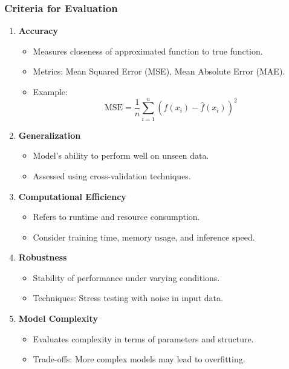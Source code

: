 \documentclass[aspectratio=169]{beamer}
\begin{document}
\begin{frame}[fragile]
  \frametitle{Criteria for Evaluation}
  \begin{enumerate}
    \item \textbf{Accuracy}
      \begin{itemize}
        \item Measures closeness of approximated function to true function.
        \item Metrics: Mean Squared Error (MSE), Mean Absolute Error (MAE).
        \item Example:
        \begin{equation}
          \text{MSE} = \frac{1}{n} \sum_{i=1}^n (f(x_i) - \hat{f}(x_i))^2
        \end{equation}
      \end{itemize}
      
    \item \textbf{Generalization}
      \begin{itemize}
        \item Model's ability to perform well on unseen data.
        \item Assessed using cross-validation techniques.
      \end{itemize}

    \item \textbf{Computational Efficiency}
      \begin{itemize}
        \item Refers to runtime and resource consumption.
        \item Consider training time, memory usage, and inference speed.
      \end{itemize}

    \item \textbf{Robustness}
      \begin{itemize}
        \item Stability of performance under varying conditions.
        \item Techniques: Stress testing with noise in input data.
      \end{itemize}

    \item \textbf{Model Complexity}
      \begin{itemize}
        \item Evaluates complexity in terms of parameters and structure.
        \item Trade-offs: More complex models may lead to overfitting.
      \end{itemize}
  \end{enumerate}
\end{frame}
\end{document}
